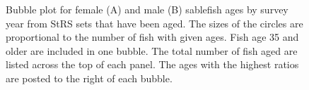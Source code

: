 \documentclass[12pt]{article}\usepackage[]{graphicx}\usepackage[]{color}
\begin{document}
\begin{figure}[htb]

{\centering {} 

}

\caption{Bubble plot for female (A) and male (B) sablefish ages by survey year from StRS sets that have been aged. The sizes of the circles are proportional to the number of fish with given ages. Fish age 35 and older are included in one bubble. The total number of fish aged are listed across the top of each panel. The ages with the highest ratios are posted to the right of each bubble.}\label{fig:figure16}
\end{figure}
\clearpage

~\\
\end{document}
